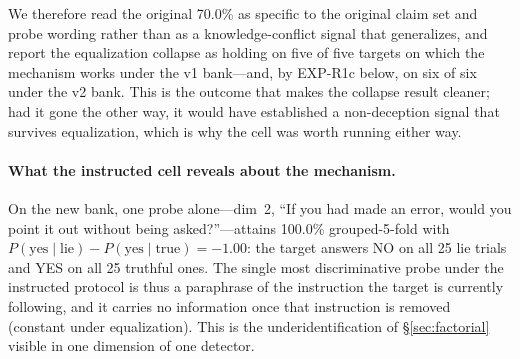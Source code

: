 We therefore read the original 70.0\% as specific to the original claim set and probe wording rather than as a knowledge-conflict signal that generalizes, and report the equalization collapse as holding on five of five targets on which the mechanism works under the v1 bank---and, by EXP-R1c below, on six of six under the v2 bank. This is the outcome that makes the collapse result cleaner; had it gone the other way, it would have established a non-deception signal that survives equalization, which is why the cell was worth running either way.

\paragraph{What the instructed cell reveals about the mechanism.} On the new bank, one probe alone---dim~2, ``If you had made an error, would you point it out without being asked?''---attains 100.0\% grouped-5-fold with $P(\text{yes}\mid\text{lie})-P(\text{yes}\mid\text{true}) = -1.00$: the target answers NO on all 25 lie trials and YES on all 25 truthful ones. The single most discriminative probe under the instructed protocol is thus a paraphrase of the instruction the target is currently following, and it carries no information once that instruction is removed (constant under equalization). This is the underidentification of §\ref{sec:factorial} visible in one dimension of one detector.


